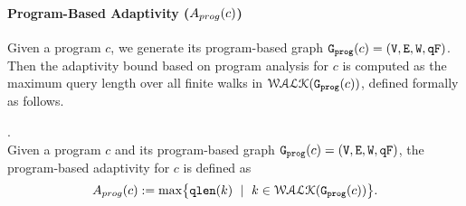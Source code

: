 \paragraph{Program-Based Adaptivity ($A_{{prog}}(c)$)}
%
Given a program ${c}$, we generate its program-based graph 
$\mathtt{{G_{prog}}}({c}) = (\mathtt{V}, \mathtt{E}, \mathtt{W}, \mathtt{qF})$.
%
Then the adaptivity bound based on program analysis for ${c}$ 
is computed as the maximum query length over all finite walks in $\mathcal{WALK}(\mathtt{{G_{prog}}}({c}))$,
%
defined formally as follows.
%
%
\begin{defn}
.
\label{def:prog_adapt}
\\
{
Given a program ${c}$ and its program-based graph 
$\mathtt{{G_{prog}}}({c}) = (\mathtt{V}, \mathtt{E}, \mathtt{W}, \mathtt{qF})$,
%
the program-based adaptivity for $c$ is defined as%
\[
\progA({c}) 
:= \max
\left\{ \qlen(k)\ \mid \  k\in \walks(\progG({c}))\right \}.
\]
}
\end{defn}  
%
%
